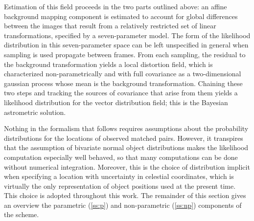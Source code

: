 \documentclass[manuscript]{aastex}
\begin{document}
Estimation of this field proceeds in the two parts outlined above: an affine background mapping component is estimated to account for global differences between the images that result from a relatively restricted set of linear transformations, specified by a seven-parameter model. The form of the likelihood distribution in this seven-parameter space can be left unspecified in general when sampling is used propagate between frames. From each sampling, the residual to the background transformation yields a local distortion field, which is characterized non-parametrically and with full covariance as a two-dimensional gaussian process whose mean is the background transformation. Chaining these two steps and tracking the sources of covariance that arise from them yields a likelihood distribution for the vector distribution field; this is the Bayesian astrometric solution.

Nothing in the formalism that follows requires assumptions about the probability distributions for the locations of observed matched pairs. However, it transpires that the assumption of bivariate normal object distributions makes the likelihood computation especially well behaved, so that many computations can be done without numerical integration. Moreover, this is the choice of distribution implicit when specifying a location with uncertainty in celestial coordinates, which is virtually the only representation of object positions used at the present time. This choice is adopted throughout this work. The remainder of this section gives an overview the parametric (\ref{ss:p}) and non-parametric (\ref{ss:np}) components of the scheme.
\end{document}
